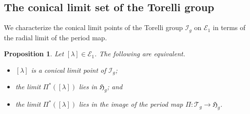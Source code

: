\documentclass[dvipdfmx]{amsart}
\newtheorem{proposition}{Proposition}[section]
\theoremstyle{remark}
\newcommand{\teich}{\mathcal{T}}
\newcommand{\mcg}{\operatorname{MCG}}
\newcommand{\tmod}{\operatorname{Mod}}
\newcommand{\torelliG}{\mathcal{I}}
\newcommand{\PThursM}{\hat{\mu}_{Th}}
\newcommand{\PSiegelThursM}{\mathscr{M}_{Th}}
\newcommand{\pml}{\mathcal{PML}}
\newcommand{\syp}{\mathop{Sp}}
\newcommand{\symrep}{\mathop{\boldsymbol{\varrho}}}
\begin{document}



\subsection{The conical limit set of the Torelli group}
We characterize the conical limit points of the Torelli group $\torelliG_g$ on $\mathcal E_1$ in terms of the radial limit of the period map.

\begin{proposition}
    \label{prop:conical_limit_set_torelli_group}
    Let $[\lambda]\in \mathcal{E}_1$. The following are equivalent.
    \begin{itemize}
    \item[(a)] $[\lambda]$ is a conical limit point of $\torelliG_{g}$; 
    \item[(b)] the limit $\Pi^*([\lambda])$ lies in $\mathfrak{H}_g$; and
    \item[(c)] the limit $\Pi^*([\lambda])$ lies in the image of the period map $\Pi\colon \teich_{g}\to \mathfrak{H}_g$.
    \end{itemize}
\end{proposition}
\end{document}
